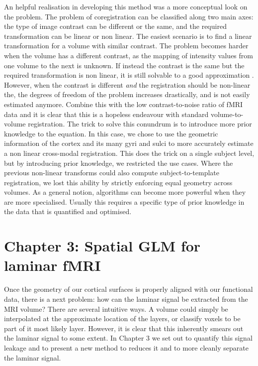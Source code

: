 An helpful realisation in developing this method was a more conceptual look on the problem. The problem of coregistration can be classified along two main axes: the type of image contrast can be different or the same, and the required transformation can be linear or non linear. The easiest scenario is to find a linear transformation for a volume with similar contrast. The problem becomes harder when the volume has a different contrast, as the mapping of intensity values from one volume to the next is unknown. If instead the contrast is the same but the required transformation is non linear, it is still solvable to a good approximation \cite{Collins1995}. However, when the contrast is different \emph{and} the registration should be non-linear the, the degrees of freedom of the problem increases drastically, and is not easily estimated anymore. Combine this with the low contrast-to-noise ratio of fMRI data and it is clear that this is a hopeless endeavour with standard volume-to-volume registration. The trick to solve this conundrum is to introduce more prior knowledge to the equation. In this case, we chose to use the geometric information of the cortex and its many gyri and sulci to more accurately estimate a non linear cross-modal registration. This does the trick on a single subject level, but by introducing prior knowledge, we restricted the use cases. Where the previous non-linear transforms could also compute subject-to-template registration, we lost this ability by strictly enforcing equal geometry across volumes. As a general notion, algorithms can become more powerful when they are more specialised. Usually this requires a specific type of prior knowledge in the data that is quantified and optimised.

\section*{Chapter 3: Spatial GLM for laminar fMRI}
Once the geometry of our cortical surfaces is properly aligned with our functional data, there is a next problem: how can the laminar signal be extracted from the MRI volume? There are several intuitive ways. A volume could simply be interpolated at the approximate location of the layers, or classify voxels to be part of it most likely layer. However, it is clear that this inherently smears out the laminar signal to some extent. In Chapter 3 we set out to quantify this signal leakage and to present a new method to reduces it and to more cleanly separate the laminar signal.

